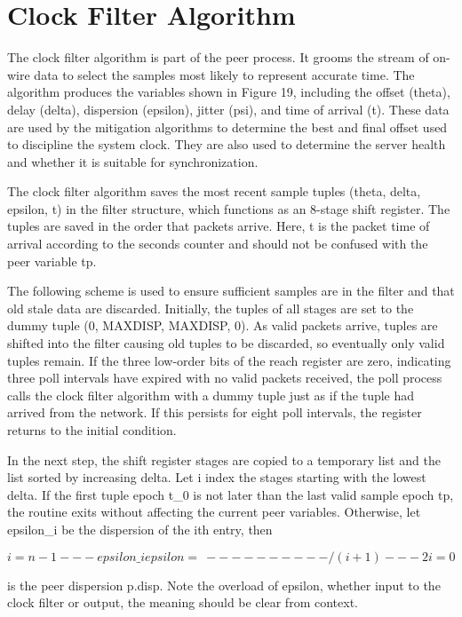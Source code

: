 \chapter{Clock Filter Algorithm}

The clock filter algorithm is part of the peer process.  It grooms
the stream of on-wire data to select the samples most likely to
represent accurate time.  The algorithm produces the variables shown
in Figure 19, including the offset (theta), delay (delta), dispersion
(epsilon), jitter (psi), and time of arrival (t).  These data are
used by the mitigation algorithms to determine the best and final
offset used to discipline the system clock.  They are also used to
determine the server health and whether it is suitable for
synchronization.

The clock filter algorithm saves the most recent sample tuples
(theta, delta, epsilon, t) in the filter structure, which functions
as an 8-stage shift register.  The tuples are saved in the order that
packets arrive.  Here, t is the packet time of arrival according to
the seconds counter and should not be confused with the peer variable
tp.

The following scheme is used to ensure sufficient samples are in the
filter and that old stale data are discarded.  Initially, the tuples
of all stages are set to the dummy tuple (0, MAXDISP, MAXDISP, 0).
As valid packets arrive, tuples are shifted into the filter causing
old tuples to be discarded, so eventually only valid tuples remain.
If the three low-order bits of the reach register are zero,
indicating three poll intervals have expired with no valid packets
received, the poll process calls the clock filter algorithm with a
dummy tuple just as if the tuple had arrived from the network.  If
this persists for eight poll intervals, the register returns to the
initial condition.

In the next step, the shift register stages are copied to a temporary
list and the list sorted by increasing delta.  Let i index the stages
starting with the lowest delta.  If the first tuple epoch t\_0 is not
later than the last valid sample epoch tp, the routine exits without
affecting the current peer variables.  Otherwise, let epsilon\_i be
the dispersion of the ith entry, then

$$
                  i=n-1
                  ---     epsilon\_i
  epsilon =       \     ----------
                  /        (i+1)
                  ---     2
                  i=0
$$

is the peer dispersion p.disp.  Note the overload of epsilon, whether
input to the clock filter or output, the meaning should be clear from
context.

